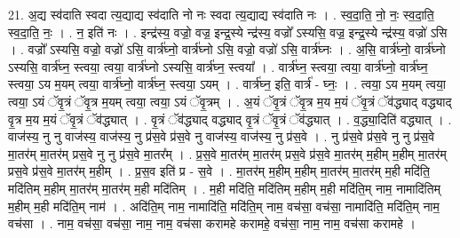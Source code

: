 \documentclass[17pt]{extarticle}
\begin{document}
21. अ॒द्य स्व॑दाति स्वदा त्य॒द्याद्य स्व॑दाति नो नः स्वदा त्य॒द्याद्य स्व॑दाति नः । . स्व॒दा॒ति॒ नो॒ नः॒ स्व॒दा॒ति॒ स्व॒दा॒ति॒ नः॒ । . न॒ इति॑ नः । . इन्द्र॑स्य॒ वज्रो॒ वज्र॒ इन्द्र॒स्ये न्द्र॑स्य॒ वज्रो᳚ ऽस्यसि॒ वज्र॒ इन्द्र॒स्ये न्द्र॑स्य॒ वज्रो॑ ऽसि । . वज्रो᳚ ऽस्यसि॒ वज्रो॒ वज्रो॑ ऽसि॒ वार्त्र॑घ्नो॒ वार्त्र॑घ्नो ऽसि॒ वज्रो॒ वज्रो॑ ऽसि॒ वार्त्र॑घ्नः । . अ॒सि॒ वार्त्र॑घ्नो॒ वार्त्र॑घ्नो ऽस्यसि॒ वार्त्र॑घ्न॒ स्त्वया॒ त्वया॒ वार्त्र॑घ्नो ऽस्यसि॒ वार्त्र॑घ्न॒ स्त्वया᳚ । . वार्त्र॑घ्न॒ स्त्वया॒ त्वया॒ वार्त्र॑घ्नो॒ वार्त्र॑घ्न॒ स्त्वया॒ ऽय म॒यम् त्वया॒ वार्त्र॑घ्नो॒ वार्त्र॑घ्न॒ स्त्वया॒ ऽयम् । . वार्त्र॑घ्न॒ इति॒ वार्त्र॑ - घ्नः॒ । . त्वया॒ ऽय म॒यम् त्वया॒ त्वया॒ ऽयं ॅवृ॒त्रं ॅवृ॒त्र म॒यम् त्वया॒ त्वया॒ ऽयं ॅवृ॒त्रम् । . अ॒यं ॅवृ॒त्रं ॅवृ॒त्र म॒य म॒यं ॅवृ॒त्रं ॅव॑द्ध्याद् वद्ध्याद् वृ॒त्र म॒य म॒यं ॅवृ॒त्रं ॅव॑द्ध्यात् । . वृ॒त्रं ॅव॑द्ध्याद् वद्ध्याद् वृ॒त्रं ॅवृ॒त्रं ॅव॑द्ध्यात् । . व॒द्ध्या॒दिति॑ वद्ध्यात् । . वाज॑स्य॒ नु नु वाज॑स्य॒ वाज॑स्य॒ नु प्र॑स॒वे प्र॑स॒वे नु वाज॑स्य॒ वाज॑स्य॒ नु प्र॑स॒वे । . नु प्र॑स॒वे प्र॑स॒वे नु नु प्र॑स॒वे मा॒तर॑म् मा॒तर॑म् प्रस॒वे नु नु प्र॑स॒वे मा॒तर᳚म् । . प्र॒स॒वे मा॒तर॑म् मा॒तर॑म् प्रस॒वे प्र॑स॒वे मा॒तर॑म् म॒हीम् म॒हीम् मा॒तर॑म् प्रस॒वे प्र॑स॒वे मा॒तर॑म् म॒हीम् । . प्र॒स॒व इति॑ प्र - स॒वे । . मा॒तर॑म् म॒हीम् म॒हीम् मा॒तर॑म् मा॒तर॑म् म॒ही मदि॑ति॒ मदि॑तिम् म॒हीम् मा॒तर॑म् मा॒तर॑म् म॒ही मदि॑तिम् । . म॒ही मदि॑ति॒ मदि॑तिम् म॒हीम् म॒ही मदि॑ति॒म् नाम॒ नामादि॑तिम् म॒हीम् म॒ही मदि॑ति॒म् नाम॑ । . अदि॑ति॒म् नाम॒ नामादि॑ति॒ मदि॑ति॒म् नाम॒ वच॑सा॒ वच॑सा॒ नामादि॑ति॒ मदि॑ति॒म् नाम॒ वच॑सा । . नाम॒ वच॑सा॒ वच॑सा॒ नाम॒ नाम॒ वच॑सा करामहे करामहे॒ वच॑सा॒ नाम॒ नाम॒ वच॑सा करामहे । \newline
\end{document}
